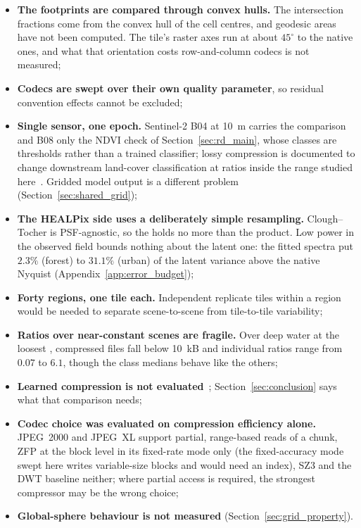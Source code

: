 \begin{itemize}
    \item \textbf{The footprints are compared through convex hulls.} The intersection fractions come from the convex hull of the cell centres, and geodesic areas have not been computed. The tile's raster axes run at about $45^\circ$ to the native ones, and what that orientation costs row-and-column codecs is not measured;
    \item \textbf{Codecs are swept over their own quality parameter}, so residual convention effects cannot be excluded;
    \item \textbf{Single sensor, one epoch.} Sentinel-2 B04 at \SI{10}{m} carries the comparison and B08 only the NDVI check of Section~\ref{sec:rd_main}, whose classes are thresholds rather than a trained classifier; lossy compression is documented to change downstream land-cover classification at ratios inside the range studied here~\cite{zabala2011lossy}. Gridded model output is a different problem (Section~\ref{sec:shared_grid});
    \item \textbf{The HEALPix side uses a deliberately simple resampling.} Clough--Tocher is PSF-agnostic, so the  holds no more than the product. Low power in the observed field bounds nothing about the latent one: the fitted spectra put $2.3\%$ (forest) to $31.1\%$ (urban) of the latent variance above the native Nyquist (Appendix~\ref{app:error_budget});
    \item \textbf{Forty regions, one tile each.} Independent replicate tiles within a region would be needed to separate scene-to-scene from tile-to-tile variability;
    \item \textbf{Ratios over near-constant scenes are fragile.} Over deep water at the loosest , compressed files fall below \SI{10}{kB} and individual ratios range from $0.07$ to $6.1$, though the class medians behave like the others;
    \item \textbf{Learned compression is not evaluated}~\cite{balle2017endtoend,valsesia2019onboard}; Section~\ref{sec:conclusion} says what that comparison needs;
    \item \textbf{Codec choice was evaluated on compression efficiency alone.} JPEG~2000 and JPEG~XL support partial, range-based reads of a chunk, ZFP at the block level in its fixed-rate mode only (the fixed-accuracy mode swept here writes variable-size blocks and would need an index), SZ3 and the DWT baseline neither; where partial access is required, the strongest compressor may be the wrong choice;
    \item \textbf{Global-sphere behaviour is not measured} (Section~\ref{sec:grid_property}).
\end{itemize}
